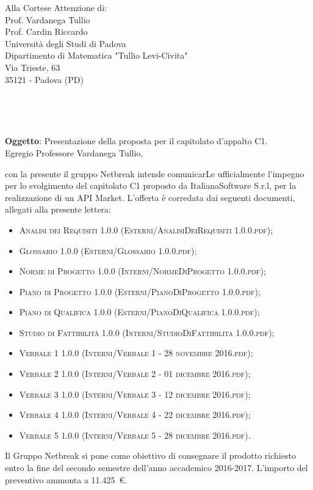 \documentclass[11pt,a4paper]{letter}
\def\opening#1{\thispagestyle{empty}
{\centering\fromaddress \vspace{0.6in} \\ %
\hspace*{\longindentation}\hspace*{\fill}\par} %
{\raggedright \toname \\ \toaddress \par} %
\vspace{0.1in} %
\noindent #1 %
}
\begin{document}

\begin{letter}
{Alla Cortese Attenzione di:\\
	Prof. Vardanega Tullio\\
	Prof. Cardin Riccardo\\
	Universit\`a degli Studi di Padova\\
	 Dipartimento di Matematica "Tullio Levi-Civita"\\
	Via Trieste, 63\\
	35121 - Padova (PD)\\
}



\opening {\textbf{Oggetto}: Presentazione della proposta per il capitolato d'appalto C1.}\\

\noindent Egregio Professore Vardanega Tullio,

\indent con la presente il gruppo Netbreak intende comunicarLe ufficialmente l'impegno per lo svolgimento del capitolato C1 proposto da ItalianaSoftware S.r.l, per la realizzazione di un API Market.
L'offerta \`e corredata dai seguenti documenti, allegati alla presente lettera:
\begin{itemize}
	\item \textsc{Analisi dei Requisiti 1.0.0 (Esterni/AnalisiDeiRequisiti 1.0.0.pdf)}; 
	\item \textsc{Glossario 1.0.0 (Esterni/Glossario 1.0.0.pdf)}; 
	\item \textsc{Norme di Progetto 1.0.0 (Interni/NormeDiProgetto 1.0.0.pdf)}; 
	\item \textsc{Piano di Progetto 1.0.0 (Esterni/PianoDiProgetto 1.0.0.pdf)}; 
	\item \textsc{Piano di Qualifica 1.0.0 (Esterni/PianoDiQualifica 1.0.0.pdf)}; 
	\item \textsc{Studio di Fattibilit\`a 1.0.0 (Interni/StudioDiFattibilita 1.0.0.pdf)}; 
	\item \textsc{Verbale 1 1.0.0 (Interni/Verbale 1 - 28 novembre 2016.pdf)}; 
	\item \textsc{Verbale 2 1.0.0 (Interni/Verbale 2 - 01 dicembre 2016.pdf)}; 
	\item \textsc{Verbale 3 1.0.0 (Interni/Verbale 3 - 12 dicembre 2016.pdf)}; 
	\item \textsc{Verbale 4 1.0.0 (Interni/Verbale 4 - 22 dicembre 2016.pdf)}; 
	\item \textsc{Verbale 5 1.0.0 (Interni/Verbale 5 - 28 dicembre 2016.pdf)}. 
\end{itemize}
	Il Gruppo Netbreak si pone come obiettivo di consegnare il prodotto richiesto entro la fine del secondo semestre dell'anno accademico 2016-2017. L'importo del preventivo ammonta a \hbox{11.425 \euro{}.}


\end{letter}
\end{document}
